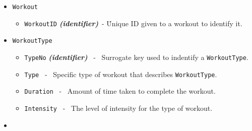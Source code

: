 \documentclass[letterpaper, 11pt]{article}
\newcommand{\1}{\mathds{1}}	%
\theoremstyle{definition}
\begin{document}
\begin{itemize}
\begin{itemize}[label=$\circ$]
        \end{itemize}
    \item \texttt{Workout}
        \begin{itemize}[label=$\circ$]
    \item \texttt{WorkoutID} \textit{\textbf{(identifier)}}\ - \. Unique ID given to a workout to identify it.
        \end{itemize}
    \item \texttt{WorkoutType}
        \begin{itemize}[label=$\circ$]
            \item \texttt{TypeNo} \textit{\textbf{(identifier)}} \ - \ Surrogate key used to  indentify a \texttt{WorkoutType}.
            \item \texttt{Type} \ - \ Specific type of workout that describes \texttt{WorkoutType}. 
            \item  \texttt{Duration} \ - \ Amount of time taken to complete the workout.
            \item \texttt{Intensity} \ - \ The level of intensity for the type of workout.
        \end{itemize}
    \item \texttt{}
\end{itemize}
\end{document}
